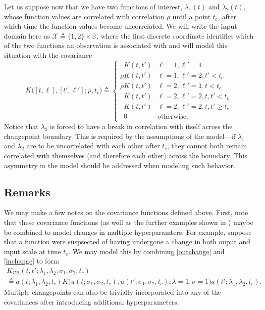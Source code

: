 \documentclass{article}
\newcommand{\deq}{\triangleq}
\newcommand{\cm}[1]{\mathcal{#1}}
\newcommand{\R}{\mathbb{R}}
\begin{document}
Let us suppose now that we have two functions of interest,
$\lambda_1(t)$ and $\lambda_2(t)$, whose function values are
correlated with correlation $\rho$ until a point $t_c$, after which
time the function values become uncorrelated.  We will write the input
domain here as $\cm{X} \deq \lbrace 1, 2 \rbrace \times \R$, where the
first discrete coordinate identifies which of the two functions an
observation is associated with and will model this situation with the
covariance
\begin{equation}
  \label{correlation}
  K\bigl( [t, \ell], [t', \ell'] ; \rho, t_c \bigr)
  \deq
  \begin{cases}
    \phantom{\rho}K(t, t') & \ell = 1, \ell' = 1 \\
    \rho K(t, t') & \ell = 1, \ell' = 2, t' < t_c \\
    \rho K(t, t') & \ell = 2, \ell' = 1, t < t_c \\
    \phantom{\rho}K(t, t') & \ell = 2, \ell' = 2, t, t' < t_c \\
    \phantom{\rho}K(t, t') & \ell = 2, \ell' = 2, t, t' \geq t_c \\
    \phantom{\rho}0 & \text{otherwise.}
  \end{cases}
\end{equation}
Notice that $\lambda_2$ is forced to have a break in correlation with
itself across the changepoint boundary.  This is required by the
assumptions of the model---if $\lambda_1$ and $\lambda_2$ are to be
uncorrelated with each other after $t_c$, they cannot both remain
correlated with themselves (and therefore each other) across the
boundary.  This asymmetry in the model should be addressed when
modeling such behavior.

\subsection{Remarks}

We may make a few notes on the covariance functions defined above.
First, note that these covariance functions (as well as the further
examples shown in \citep{cpcj, thesis}) maybe be combined to model
changes in multiple hyperparamters.  For example, suppose that
a function were suspsected of having undergone a change in both 
ouput and input scale at time $t_c$.  We may model this by combining
\eqref{outchange} and \eqref{inchange} to form
\begin{multline}
  \label{bothchange}
  K_{\text{CB}}
  (t, t'; \lambda_1, \lambda_2, \sigma_1, \sigma_2, t_c)
  \\
  \deq
  a(t; \lambda_1, \lambda_2, t_c)
  K
  \bigl(
    u(t; \sigma_1, \sigma_2, t_c),
    u(t'; \sigma_1, \sigma_2, t_c)
    ;
    \lambda = 1, \sigma = 1
  \bigr)
  a(t'; \lambda_1, \lambda_2, t_c).
\end{multline}
Multiple changepoints can also be trivially incorporated into any of
the covariances after introducing additional hyperparameters.
\end{document}
